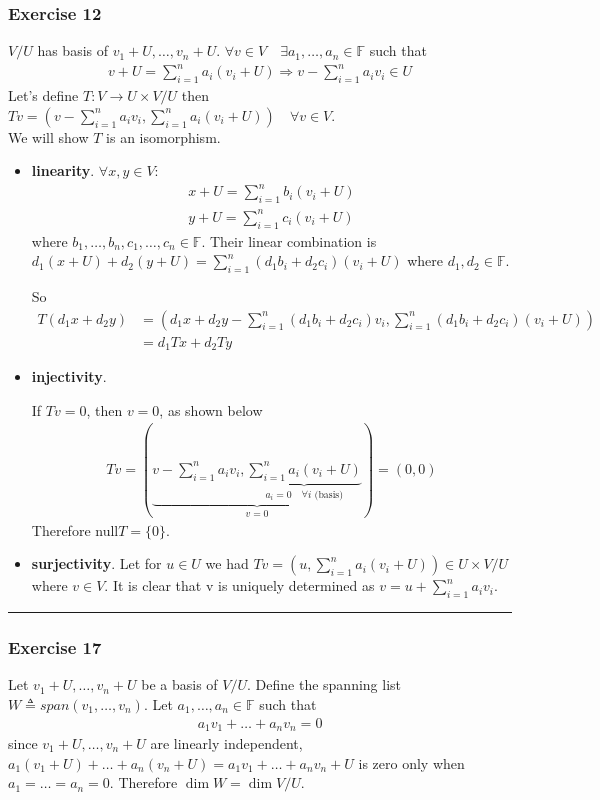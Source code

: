 \documentclass[12pt, letterpaper]{scrartcl}
\newcommand{\F}{\mathbb{F}}
\begin{document}
\subsubsection*{Exercise 12}
$V/U$ has basis of $v_1+U, \dots, v_n+U$. $\forall v\in V \quad \exists a_1, \dots,a_n\in\F$ such that
\begin{align*}
    v+U=\sum_{i=1}^n a_i(v_i+U)\Rightarrow v-\sum_{i=1}^n a_iv_i\in U
\end{align*}
Let's define $T:V\rightarrow U\times V/U$ then $Tv=(v-\sum_{i=1}^n a_iv_i, \sum_{i=1}^n a_i(v_i+U))\quad\forall v\in V$.\\

We will show $T$ is an isomorphism.
\begin{itemize}
    \item \textbf{linearity}.
    $\forall x,y \in V$:
    \begin{align*}
        x+U=\sum_{i=1}^n b_i(v_i+U)\\
        y+U = \sum_{i=1}^n c_i(v_i+U)
    \end{align*}
    where $b_1, \dots, b_n, c_1, \dots, c_n\in\F$. Their linear combination is $d_1(x+U)+d_2(y+U)=\sum_{i=1}^n (d_1b_i+d_2c_i)(v_i+U)$ where $d_1,d_2\in\F$.

    So
    \begin{align*}
        T(d_1x+d_2y)&=(d_1x+d_2y-\sum_{i=1}^n (d_1b_i+d_2c_i)v_i, \sum_{i=1}^n (d_1b_i+d_2c_i)(v_i+U))\\
        &=d_1Tx+d_2Ty
    \end{align*}
    
    
    \item \textbf{injectivity}.

    If $Tv=0$, then $v=0$, as shown below
    \begin{align*}
        Tv=(\underbrace{v-\sum_{i=1}^n a_iv_i, \underbrace{\sum_{i=1}^n a_i(v_i+U)}_{a_i=0 \quad \forall i \text{ (basis)}}}_{v=0})=(0,0)
    \end{align*}
    Therefore null$T=\{0\}$.
    
    \item \textbf{surjectivity}.
    Let for $u\in U$ we had $Tv = (u, \sum_{i=1}^n a_i(v_i+U)) \in U\times V/U$ where $v\in V$. It is clear that v is uniquely determined as $v=u+\sum_{i=1}^n a_iv_i$.
\end{itemize}
\vskip1mm\hrule

\subsubsection*{Exercise 17}
Let $v_1+U,\dots,v_n+U$ be a basis of $V/U$. Define the spanning list $W\triangleq span(v_1,\dots,v_n)$. Let $a_1,\dots,a_n\in\F$ such that
\begin{align*}
    a_1v_1+\dots+a_nv_n=0
\end{align*}
since $v_1+U,\dots,v_n+U$ are linearly independent, $a_1(v_1+U)+\dots+a_n(v_n+U)=a_1v_1+\dots+a_nv_n +U$ is zero only when $a_1=\dots=a_n=0$. Therefore $\dim W = \dim V/U$.\\
\end{document}
